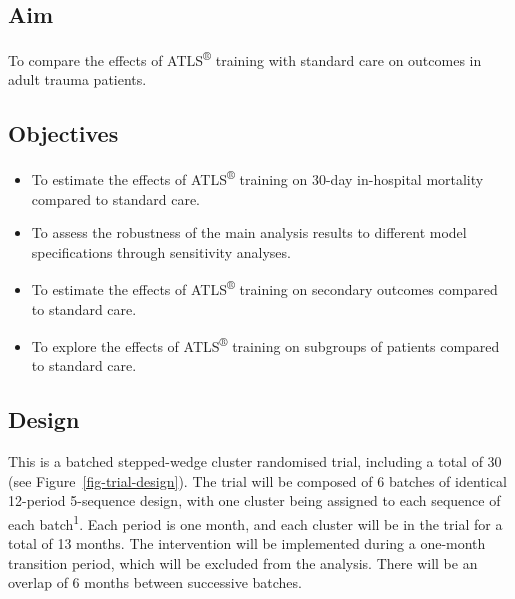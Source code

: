 \documentclass[
]{scrartcl}
\providecommand{\tightlist}{%
  \setlength{\itemsep}{0pt}\setlength{\parskip}{0pt}}\usepackage{longtable,booktabs,array}
\begin{document}
\hypertarget{aim}{%
\subsection{Aim}\label{aim}}

To compare the effects of ATLS\textsuperscript{®} training with standard
care on outcomes in adult trauma patients.

\hypertarget{objectives}{%
\subsection{Objectives}\label{objectives}}

\begin{itemize}
\tightlist
\item
  To estimate the effects of ATLS\textsuperscript{®} training on 30-day
  in-hospital mortality compared to standard care.
\item
  To assess the robustness of the main analysis results to different
  model specifications through sensitivity analyses.
\item
  To estimate the effects of ATLS\textsuperscript{®} training on
  secondary outcomes compared to standard care.
\item
  To explore the effects of ATLS\textsuperscript{®} training on
  subgroups of patients compared to standard care.
\end{itemize}

\hypertarget{design}{%
\subsection{Design}\label{design}}

This is a batched stepped-wedge cluster randomised trial, including a
total of 30 (see Figure~\ref{fig-trial-design}). The trial will be
composed of 6 batches of identical 12-period 5-sequence design, with one
cluster being assigned to each sequence of each
batch\textsuperscript{1}. Each period is one month, and each cluster
will be in the trial for a total of 13 months. The intervention will be
implemented during a one-month transition period, which will be excluded
from the analysis. There will be an overlap of 6 months between
successive batches.
\end{document}
